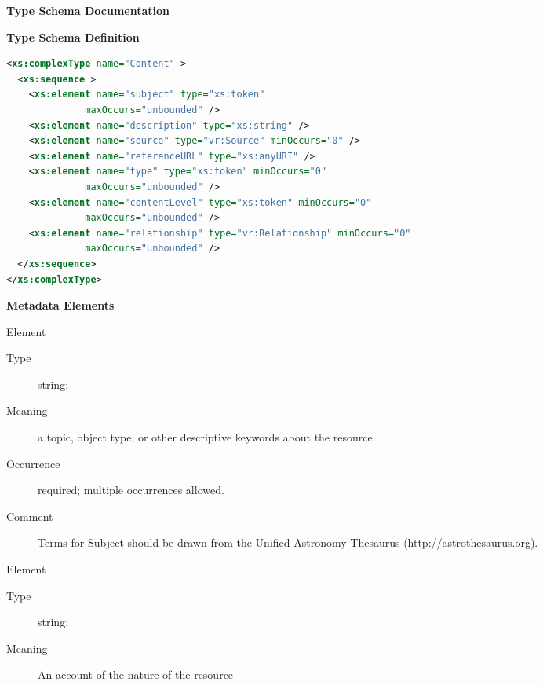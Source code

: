 \documentclass[11pt,a4paper]{ivoa}
\begin{document}
\begin{generated}
\begingroup
      	\renewcommand*\descriptionlabel[1]{%
      	\hbox to 5.5em{\emph{#1}\hfil}}\vspace{2ex}\noindent\textbf{ Type Schema Documentation}


\vspace{1ex}\noindent\textbf{ Type Schema Definition}

\begin{lstlisting}[language=XML,basicstyle=\footnotesize]
<xs:complexType name="Content" >
  <xs:sequence >
    <xs:element name="subject" type="xs:token"
              maxOccurs="unbounded" />
    <xs:element name="description" type="xs:string" />
    <xs:element name="source" type="vr:Source" minOccurs="0" />
    <xs:element name="referenceURL" type="xs:anyURI" />
    <xs:element name="type" type="xs:token" minOccurs="0"
              maxOccurs="unbounded" />
    <xs:element name="contentLevel" type="xs:token" minOccurs="0"
              maxOccurs="unbounded" />
    <xs:element name="relationship" type="vr:Relationship" minOccurs="0"
              maxOccurs="unbounded" />
  </xs:sequence>
</xs:complexType>
\end{lstlisting}

\vspace{0.5ex}\noindent\textbf{ Metadata Elements}

\begingroup\small\begin{bigdescription}\item[Element \xmlel{subject}]
\begin{description}
\item[Type] string: 
\item[Meaning] 
               a topic, object type, or other descriptive keywords 
               about the resource.  
             
\item[Occurrence] required; multiple occurrences allowed.
\item[Comment] 
               Terms for Subject should be drawn from the Unified
               Astronomy Thesaurus (http://astrothesaurus.org).
             

\end{description}
\item[Element \xmlel{description}]
\begin{description}
\item[Type] string: 
\item[Meaning] 
               An account of the nature of the resource
             

\end{description}
\end{bigdescription}
\end{generated}
\end{document}
